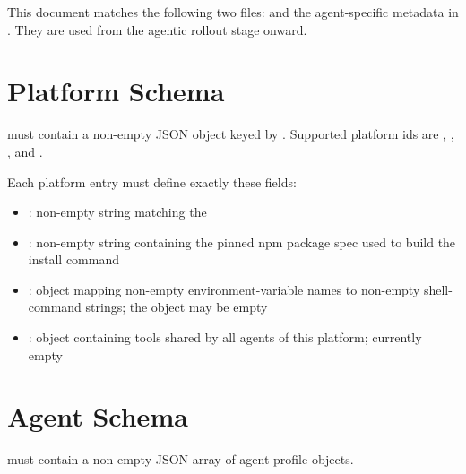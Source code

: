 \documentclass[11pt]{article}
\begin{document}
\label{docstart:agent_profiles}
This document matches the following two files:  and the agent-specific metadata in .
They are used from the agentic rollout stage onward.

\section*{Platform Schema}
 must contain a non-empty JSON object keyed by .
Supported platform ids are , , , and .

Each platform entry must define exactly these fields:
\begin{itemize}
\item {}: non-empty string matching the 
\item {}: non-empty string containing the pinned npm package spec used to build the install command
\item {}: object mapping non-empty environment-variable names to non-empty shell-command strings; the object may be empty
\item {}: object containing tools shared by all agents of this platform; currently empty
\end{itemize}

\section*{Agent Schema}
 must contain a non-empty JSON array of agent profile objects.
\end{document}
